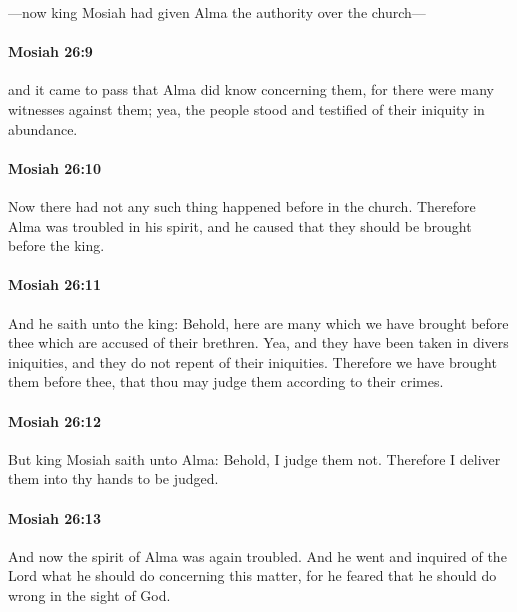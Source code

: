 			---now king Mosiah had given Alma the authority over the church---

		\paragraph{Mosiah 26:9} %
			\label{MOSIAH-26-9}

			and it came to pass that Alma did know concerning them,
			for there were many witnesses against them;
			yea, the people stood and testified of their iniquity in abundance.

		\paragraph{Mosiah 26:10} %
			\label{MOSIAH-26-10}

			Now there had not any such thing happened before in the church.
			Therefore Alma was troubled in his spirit,
			and he caused that they should be brought before the king.

		\paragraph{Mosiah 26:11} %
			\label{MOSIAH-26-11}

			And he saith unto the king:
			Behold, here are many which we have brought before thee
			which are accused of their brethren.
			Yea, and they have been taken in divers iniquities,
			and they do not repent of their iniquities.
			Therefore we have brought them before thee,
			that thou may judge them according to their crimes.

		\paragraph{Mosiah 26:12} %
			\label{MOSIAH-26-12}

			But king Mosiah saith unto Alma:
			Behold, I judge them not.
			Therefore I deliver them into thy hands to be judged.

		\paragraph{Mosiah 26:13} %
			\label{MOSIAH-26-13}

			And now the spirit of Alma was again troubled.
			And he went and inquired of the Lord what he should do concerning this matter,
			for he feared that he should do wrong in the sight of God.

